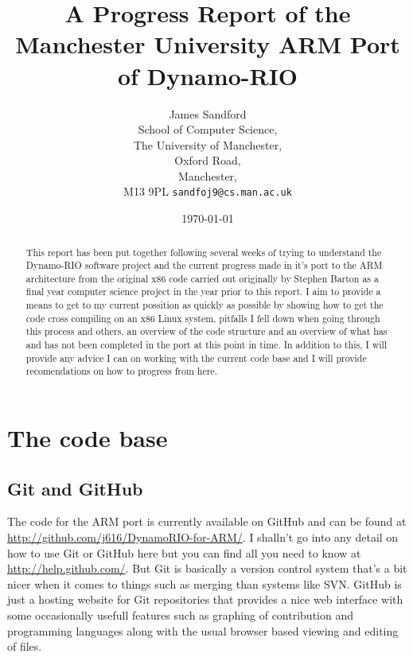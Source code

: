 \documentclass[a4paper]{article}
\title{A Progress Report of the Manchester University ARM Port of Dynamo-RIO}
\author{James Sandford\\
School of Computer Science,\\
The University of Manchester,\\
Oxford Road,\\
Manchester,\\
M13 9PL
\texttt{sandfoj9@cs.man.ac.uk}}
\date{\today}
\begin{document}
\maketitle
\newpage


\begin{abstract}
This report has been put together following several weeks of trying to
understand the Dynamo-RIO software project and the current progress made in it's
port to the ARM architecture from the original x86 code carried out originally 
by Stephen Barton as a final year computer science project in the year prior to 
this report. I aim to provide a means to get to my current possition as quickly
as possible by showing how to get the code cross compiling on an x86 Linux
system, pitfalls I fell down when going through this process and others, an
overview of the code structure and an overview of what has and has not been
completed in the port at this point in time. In addition to this, I will provide
any advice I can on working with the current code base and I will provide
recomendations on how to progress from here.
\end{abstract}
\newpage


\tableofcontents
\newpage


\section{The code base}
\subsection{Git and GitHub}
The code for the ARM port is currently available on GitHub and can be found at
\url{http://github.com/j616/DynamoRIO-for-ARM/}. I shalln't go into any detail
on how to use Git or GitHub here but you can find all you need to know at
\url{http://help.github.com/}. But Git is basically a version control system
that's a bit nicer when it comes to things such as merging than systems like
SVN. GitHub is just a hosting website for Git repositories that provides a nice
web interface with some occasionally usefull features such as graphing of
contribution and programming languages along with the usual browser based
viewing and editing of files.
\end{document}
